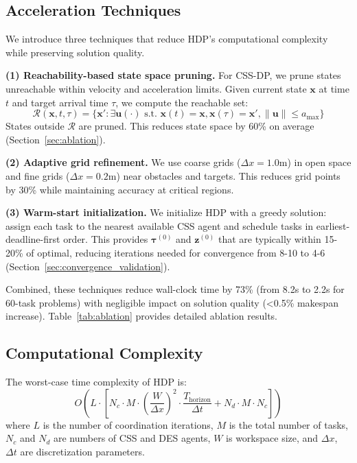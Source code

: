 \documentclass[manuscript,screen,review]{acmart}
\begin{document}
\subsection{Acceleration Techniques}
\label{sec:acceleration}

We introduce three techniques that reduce HDP's computational complexity while 
preserving solution quality.

\textbf{(1) Reachability-based state space pruning.} For CSS-DP, we prune 
states unreachable within velocity and acceleration limits. Given current 
state $\mathbf{x}$ at time $t$ and target arrival time $\tau$, we compute 
the reachable set:
\begin{equation}
\mathcal{R}(\mathbf{x}, t, \tau) = \{\mathbf{x}': \exists \mathbf{u}(\cdot) \text{ s.t. } \mathbf{x}(t) = \mathbf{x}, \mathbf{x}(\tau) = \mathbf{x}', \|\mathbf{u}\| \leq a_{\max}\}
\end{equation}
States outside $\mathcal{R}$ are pruned. This reduces state space by 60\% 
on average (Section~\ref{sec:ablation}).

\textbf{(2) Adaptive grid refinement.} We use coarse grids ($\Delta x = 1.0$m) 
in open space and fine grids ($\Delta x = 0.2$m) near obstacles and targets. 
This reduces grid points by 30\% while maintaining accuracy at critical regions.

\textbf{(3) Warm-start initialization.} We initialize HDP with a greedy 
solution: assign each task to the nearest available CSS agent and schedule 
tasks in earliest-deadline-first order. This provides $\boldsymbol{\tau}^{(0)}$ 
and $\mathbf{z}^{(0)}$ that are typically within 15-20\% of optimal, reducing 
iterations needed for convergence from 8-10 to 4-6 (Section~\ref{sec:convergence_validation}).

Combined, these techniques reduce wall-clock time by 73\% (from 8.2s to 2.2s 
for 60-task problems) with negligible impact on solution quality (<0.5\% 
makespan increase). Table~\ref{tab:ablation} provides detailed ablation results.

\subsection{Computational Complexity}

\begin{proposition}
The worst-case time complexity of HDP is:
\begin{equation}
O\left( L \cdot \left[ N_c \cdot M \cdot \left(\frac{W}{\Delta x}\right)^2 \cdot \frac{T_{\text{horizon}}}{\Delta t} + N_d \cdot M \cdot N_c \right] \right)
\label{eq:complexity_hdp}
\end{equation}
where $L$ is the number of coordination iterations, $M$ is the total number
of tasks, $N_c$ and $N_d$ are numbers of CSS and DES agents, $W$ is workspace
size, and $\Delta x$, $\Delta t$ are discretization parameters.
\label{prop:complexity}
\end{proposition}
\end{document}
